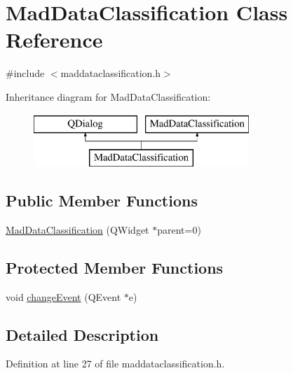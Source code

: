 \hypertarget{class_mad_data_classification}{\section{Mad\-Data\-Classification Class Reference}
\label{class_mad_data_classification}
}


{\ttfamily \#include $<$maddataclassification.\-h$>$}

Inheritance diagram for Mad\-Data\-Classification\-:\begin{figure}[H]
\begin{center}
\leavevmode
\includegraphics[height=2.000000cm]{class_mad_data_classification}
\end{center}
\end{figure}
\subsection*{Public Member Functions}
\begin{DoxyCompactItemize}
\item 
\hyperlink{class_mad_data_classification_a8c1d8f63b5d348531fbccb263f7f0635}{Mad\-Data\-Classification} (Q\-Widget $\ast$parent=0)
\end{DoxyCompactItemize}
\subsection*{Protected Member Functions}
\begin{DoxyCompactItemize}
\item 
void \hyperlink{class_mad_data_classification_a75376b6826fe8316fc1e5517111defb4}{change\-Event} (Q\-Event $\ast$e)
\end{DoxyCompactItemize}


\subsection{Detailed Description}


Definition at line 27 of file maddataclassification.\-h.



